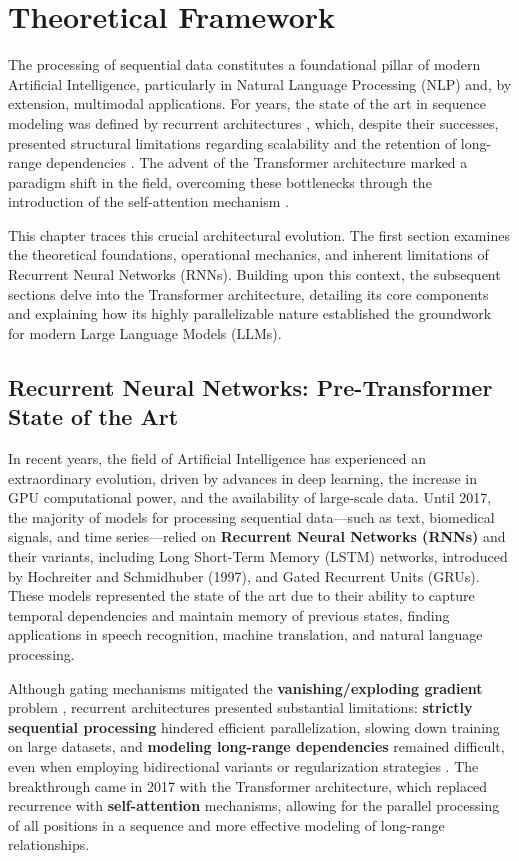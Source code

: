\chapter{Theoretical Framework}
The processing of sequential data constitutes a foundational pillar of modern Artificial Intelligence, particularly in Natural Language Processing (NLP) and, by extension, multimodal applications. For years, the state of the art in sequence modeling was defined by recurrent architectures \cite{rnn_sequence}, which, despite their successes, presented structural limitations regarding scalability and the retention of long-range dependencies \cite{analyticsvidhya}. The advent of the Transformer architecture marked a paradigm shift in the field, overcoming these bottlenecks through the introduction of the self-attention mechanism \cite{arxiv-attention}.\par
This chapter traces this crucial architectural evolution. The first section examines the theoretical foundations, operational mechanics, and inherent limitations of Recurrent Neural Networks (RNNs). Building upon this context, the subsequent sections delve into the Transformer architecture, detailing its core components and explaining how its highly parallelizable nature established the groundwork for modern Large Language Models (LLMs).

\section{Recurrent Neural Networks: Pre-Transformer State of the Art}
\label{chap:rnn}
\noindent
In recent years, the field of Artificial Intelligence has experienced an extraordinary evolution, driven by advances in deep learning, the increase in GPU computational power, and the availability of large-scale data. Until 2017, the majority of models for processing sequential data—such as text, biomedical signals, and time series—relied on \textbf{Recurrent Neural Networks (RNNs)} \cite{rnn_sequence, cs231n-rnn, quarkml-rnn-explained} and their variants, including Long Short-Term Memory (LSTM) networks, introduced by Hochreiter and Schmidhuber (1997), and Gated Recurrent Units (GRUs). These models represented the state of the art due to their ability to capture temporal dependencies and maintain memory of previous states, finding applications in speech recognition, machine translation, and natural language processing.

Although gating mechanisms mitigated the \textbf{vanishing/exploding gradient} problem \cite{quarkml-bptt}, recurrent architectures presented substantial limitations: \textbf{strictly sequential processing} hindered efficient parallelization, slowing down training on large datasets, and \textbf{modeling long-range dependencies} remained difficult, even when employing bidirectional variants or regularization strategies \cite{analyticsvidhya}. The breakthrough came in 2017 with the Transformer architecture, which replaced recurrence with \textbf{self-attention} mechanisms, allowing for the parallel processing of all positions in a sequence and more effective modeling of long-range relationships.

